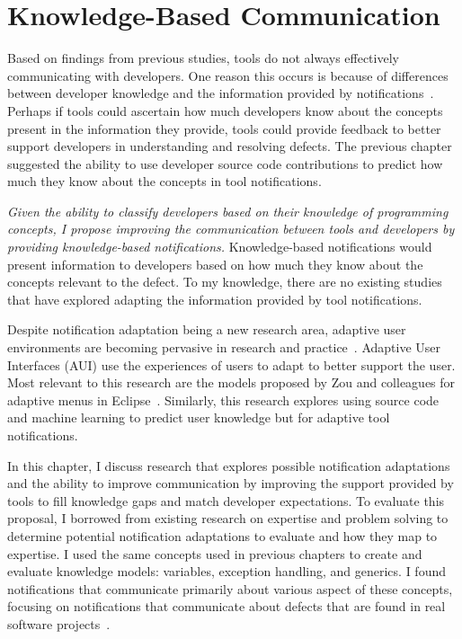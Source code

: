 \chapter{Knowledge-Based Communication}
\label{chap:improve}

Based on findings from previous studies, tools do not always effectively communicating with developers.
One reason this occurs is because of differences between developer knowledge and the information provided by notifications~\cite{johnson2016cross}.
Perhaps if tools could ascertain how much developers know about the concepts present in the information they provide, tools could provide feedback to better support developers in understanding and resolving defects.
The previous chapter suggested the ability to use developer source code contributions to predict how much they know about the concepts in tool notifications.

\textit{Given the ability to classify developers based on their knowledge of programming concepts, I propose improving the communication between tools and developers by providing knowledge-based notifications.}
Knowledge-based notifications would present information to developers based on how much they know about the concepts relevant to the defect.
To my knowledge, there are no existing studies that have explored adapting the information provided by tool notifications.

Despite notification adaptation being a new research area, adaptive user environments are becoming pervasive in research and practice~\cite{zou2008adapting, amershi2007unsupervised, stamper2009unsupervised}. 
Adaptive User Interfaces (AUI) use the experiences of users to adapt to better support the user.
Most relevant to this research are the models proposed by Zou and colleagues for adaptive menus in Eclipse~\cite{zou2008adapting}.
Similarly, this research explores using source code and machine learning to predict user knowledge but for adaptive tool notifications.


In this chapter, I discuss research that explores possible notification adaptations and the ability to improve communication by improving the support provided by tools to fill knowledge gaps and match developer expectations. 
To evaluate this proposal, I borrowed from existing research on expertise and problem solving to determine potential notification adaptations to evaluate and how they map to expertise.
I used the same concepts used in previous chapters to create and evaluate knowledge models: variables, exception handling, and generics.
I found notifications that communicate primarily about various aspect of these concepts, focusing on notifications that communicate about defects that are found in real software projects~\cite{ayewah2007evaluating, zheng2006value}.


